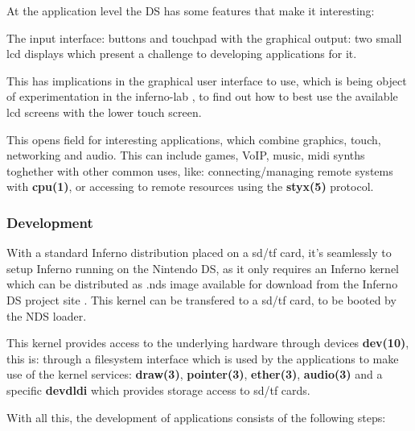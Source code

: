 \documentclass[11pt]{p9article}
\begin{document}
At the application level the DS has some features that make it interesting:
	
The input interface: buttons and touchpad with the graphical output:
two small lcd displays which present a challenge to developing applications for it.

This has implications in the graphical user interface to use,
which is being object of experimentation in the inferno-lab \cite{caerwyn-ipn},
to find out how to best use the available lcd screens with the lower touch screen.

This opens field for interesting applications, which combine
graphics, touch, networking and audio.
This can include games, VoIP, music, midi synths toghether with
other common uses, like: connecting/managing remote systems with \textbf{cpu(1)},
or accessing to remote resources using the \textbf{styx(5)} protocol.
		
\subsubsection{Development}

With a standard Inferno distribution placed on a sd/tf card,
it's seamlessly to setup Inferno running on the Nintendo DS,
as it only requires an Inferno kernel which can be distributed as .nds image
available for download from the Inferno DS project site \cite{inferno-ds}.
This kernel can be transfered to a sd/tf card, to be booted by the NDS loader.

This kernel provides access to the underlying hardware through devices \textbf{dev(10)},
this is: through a filesystem interface which is used by the applications to
make use of the kernel services: \textbf{draw(3)}, \textbf{pointer(3)}, \textbf{ether(3)}, \textbf{audio(3)}
and a specific \textbf{devdldi} which provides storage access to sd/tf cards.

With all this, the development of applications consists of the following steps:
\end{document}
